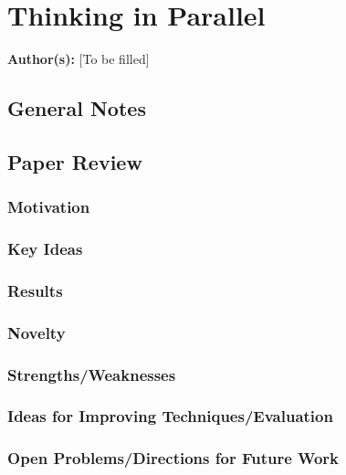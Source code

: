 \section{Thinking in Parallel}

\textbf{Author(s):} [To be filled]

\subsection{General Notes}


\subsection{Paper Review}

\subsubsection{Motivation}


\subsubsection{Key Ideas}


\subsubsection{Results}


\subsubsection{Novelty}


\subsubsection{Strengths/Weaknesses}


\subsubsection{Ideas for Improving Techniques/Evaluation}


\subsubsection{Open Problems/Directions for Future Work}

